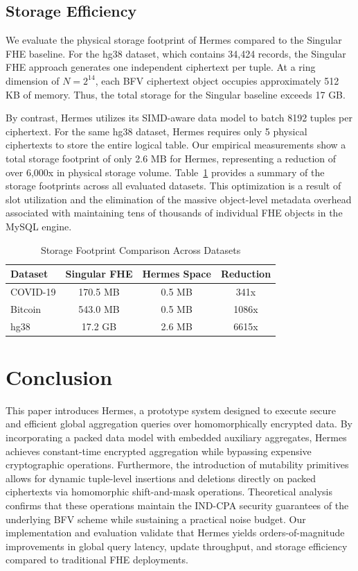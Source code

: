 \documentclass[sigconf,nonacm]{acmart}
\begin{document}
\subsection{Storage Efficiency}
\label{sec:eval_storage}

We evaluate the physical storage footprint of Hermes compared to the Singular FHE baseline. For the hg38 dataset, which contains 34,424 records, the Singular FHE approach generates one independent ciphertext per tuple. At a ring dimension of $N = 2^{14}$, each BFV ciphertext object occupies approximately 512 KB of memory. Thus, the total storage for the Singular baseline exceeds 17 GB. 

By contrast, Hermes utilizes its SIMD-aware data model to batch 8192 tuples per ciphertext. For the same hg38 dataset, Hermes requires only 5 physical ciphertexts to store the entire logical table. Our empirical measurements show a total storage footprint of only 2.6 MB for Hermes, representing a reduction of over 6,000x in physical storage volume. Table~\ref{tab:storage_summary} provides a summary of the storage footprints across all evaluated datasets. This optimization is a result of slot utilization and the elimination of the massive object-level metadata overhead associated with maintaining tens of thousands of individual FHE objects in the MySQL engine.

\begin{table}[t]
\centering
\caption{Storage Footprint Comparison Across Datasets}
\label{tab:storage_summary}
\begin{tabular}{l c c c}
\hline
Dataset & Singular FHE & Hermes Space & Reduction \\ \hline
COVID-19 & 170.5 MB & 0.5 MB & 341x \\
Bitcoin & 543.0 MB & 0.5 MB & 1086x \\
hg38 & 17.2 GB & 2.6 MB & 6615x \\ \hline
\end{tabular}
\end{table}

\section{Conclusion}
\label{sec:conclusion}

This paper introduces Hermes, a prototype system designed to execute secure and efficient global aggregation queries over homomorphically encrypted data. By incorporating a packed data model with embedded auxiliary aggregates, Hermes achieves constant-time encrypted aggregation while bypassing expensive cryptographic operations. Furthermore, the introduction of mutability primitives allows for dynamic tuple-level insertions and deletions directly on packed ciphertexts via homomorphic shift-and-mask operations. Theoretical analysis confirms that these operations maintain the IND-CPA security guarantees of the underlying BFV scheme while sustaining a practical noise budget.   
Our implementation and evaluation validate that Hermes yields orders-of-magnitude improvements in global query latency, update throughput, and storage efficiency compared to traditional FHE deployments. 
\end{document}
